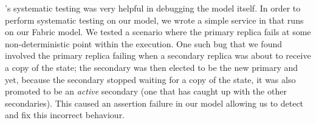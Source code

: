 \psharp's systematic testing was very helpful in debugging the model itself.
In order to perform systematic testing on our model,
we wrote a simple service in \psharp{}
that runs on our Fabric model.
We tested a scenario where the primary replica
fails at some non-deterministic point
within the execution.
One such bug that we found
involved
the primary replica
failing
when a secondary replica
was about to receive a copy of the state;
the secondary was then elected to be the new primary
and yet, because the secondary stopped waiting for
a copy of the state, it was
also promoted to be an \emph{active} secondary
(one that has caught up with the other secondaries).
This caused an assertion failure in our model
allowing us to detect and fix this incorrect behaviour.





